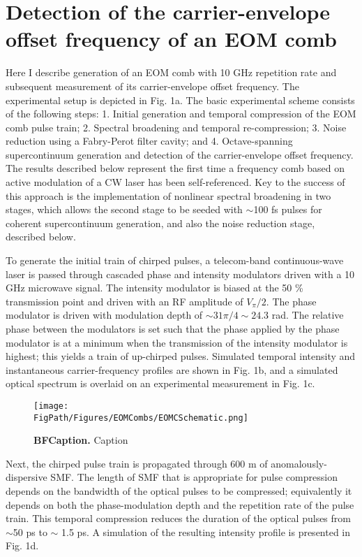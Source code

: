 \section{Detection of the carrier-envelope offset frequency of an EOM comb}

Here I describe generation of an EOM comb with 10 GHz repetition rate and subsequent measurement of its carrier-envelope offset frequency. The experimental setup is depicted in Fig. 1a. The basic experimental scheme consists of the following steps: 1. Initial generation and temporal compression of the EOM comb pulse train; 2. Spectral broadening and temporal re-compression; 3. Noise reduction using a Fabry-Perot filter cavity; and 4. Octave-spanning supercontinuum generation and detection of the carrier-envelope offset frequency. The results described below represent the first time a frequency comb based on active modulation of a CW laser has been self-referenced. Key to the success of this approach is the implementation of nonlinear spectral broadening in two stages, which allows the second stage to be seeded with $\sim$100 fs pulses for coherent supercontinuum generation, and also the noise reduction stage, described below. 

To generate the initial train of chirped pulses, a telecom-band continuous-wave laser is passed through cascaded phase and intensity modulators driven with a 10 GHz microwave signal. The intensity modulator is biased at the 50 \% transmission point and driven with an RF amplitude of $V_\pi/2$.   The phase modulator is driven with modulation depth of $\sim31\pi/4\sim24.3$ rad. The relative phase between the modulators is set such that the phase applied by the phase modulator is at a minimum when the transmission of the intensity modulator is highest; this yields a train of up-chirped pulses. Simulated temporal intensity and instantaneous carrier-frequency profiles are shown in Fig. 1b, and a simulated optical spectrum is overlaid on an experimental measurement in Fig. 1c.

\begin{figure}[htpb]
	\begin{center}
		\texttt{[image: \\FigPath/Figures/EOMCombs/EOMCSchematic.png]}
	\end{center}
	\caption[Figure Title]{\textbf{BFCaption.} Caption}
	\label{fig:PPConcept}
\end{figure} 


Next, the chirped pulse train is propagated through 600 m of anomalously-dispersive SMF. The length of SMF that is appropriate for pulse compression depends on the bandwidth of the optical pulses to be compressed; equivalently it depends on both the phase-modulation depth and the repetition rate of the pulse train. This temporal compression reduces the duration of the optical pulses from $\sim$50 ps to $\sim$ 1.5 ps. A simulation of the resulting intensity profile is presented in Fig. 1d. 

